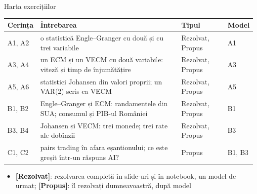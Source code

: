 \begin{frame}{Harta exercițiilor}
\itemsize{\small}
\begin{center}
\footnotesize
\begin{tabular}{>{\raggedright\arraybackslash}p{1.1cm}>{\raggedright\arraybackslash}p{7.5cm}>{\raggedright\arraybackslash}p{1.9cm}>{\raggedright\arraybackslash}p{1.4cm}}
\toprule
\textbf{Cerința} & \textbf{Întrebarea} & \textbf{Tipul} & \textbf{Model} \\
\midrule
A1, A2 & o statistică Engle--Granger cu două și cu trei variabile & Rezolvat, Propus & A1 \\
A3, A4 & un ECM și un VECM cu două variabile: viteză și timp de înjumătățire & Rezolvat, Propus & A3 \\
A5, A6 & statistici Johansen din valori proprii; un VAR(2) scris ca VECM & Rezolvat, Propus & A5 \\
B1, B2 & Engle--Granger și ECM: randamentele din SUA; consumul și PIB-ul României & Rezolvat, Propus & B1 \\
B3, B4 & Johansen și VECM: trei monede; trei rate ale dobînzii & Rezolvat, Propus & B3 \\
C1, C2 & pairs trading în afara eșantionului; ce este greșit într-un răspuns AI? & Propus & B1, B3 \\
\bottomrule
\end{tabular}
\end{center}
\begin{itemize}
    \item \textbf{[Rezolvat]}: rezolvarea completă în slide-uri și în notebook, un model de urmat; \textbf{[Propus]}: îl rezolvați dumneavoastră, după model
\end{itemize}
\end{frame}

